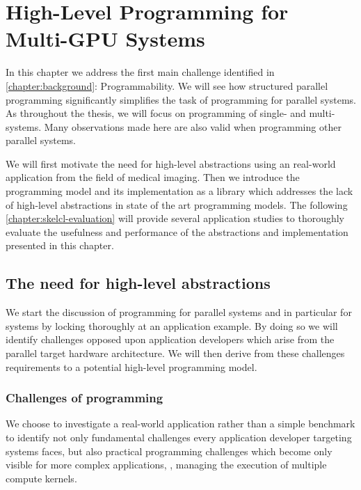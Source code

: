 
\chapter{High-Level Programming for Multi-GPU Systems}

\label{chapter:skelcl}

In this chapter we address the first main challenge identified in \autoref{chapter:background}: Programmability.
We will see how structured parallel programming significantly simplifies the task of programming for parallel systems.
As throughout the thesis, we will focus on programming of single- and multi-\GPU systems.
Many observations made here are also valid when programming other parallel systems.

We will first motivate the need for high-level abstractions using an real-world \OpenCL application from the field of medical imaging.
Then we introduce the \emph{\SkelCL} programming model and its implementation as a \Cpp library which addresses the lack of high-level abstractions in state of the art \GPU programming models.
The following \autoref{chapter:skelcl-evaluation} will provide several application studies to thoroughly evaluate the usefulness and performance of the abstractions and implementation presented in this chapter.


\section{The need for high-level abstractions}
We start the discussion of programming for parallel systems and in particular for \GPU systems by locking thoroughly at an application example.
By doing so we will identify challenges opposed upon application developers which arise from the parallel target hardware architecture.
We will then derive from these challenges requirements to a potential high-level programming model.


\subsection{Challenges of \GPU programming}
\label{section:opencl-example}
We choose to investigate a real-world application rather than a simple benchmark to identify not only fundamental challenges every application developer targeting \GPU systems faces, but also practical programming challenges which become only visible for more complex applications, \eg, managing the execution of multiple compute kernels.

